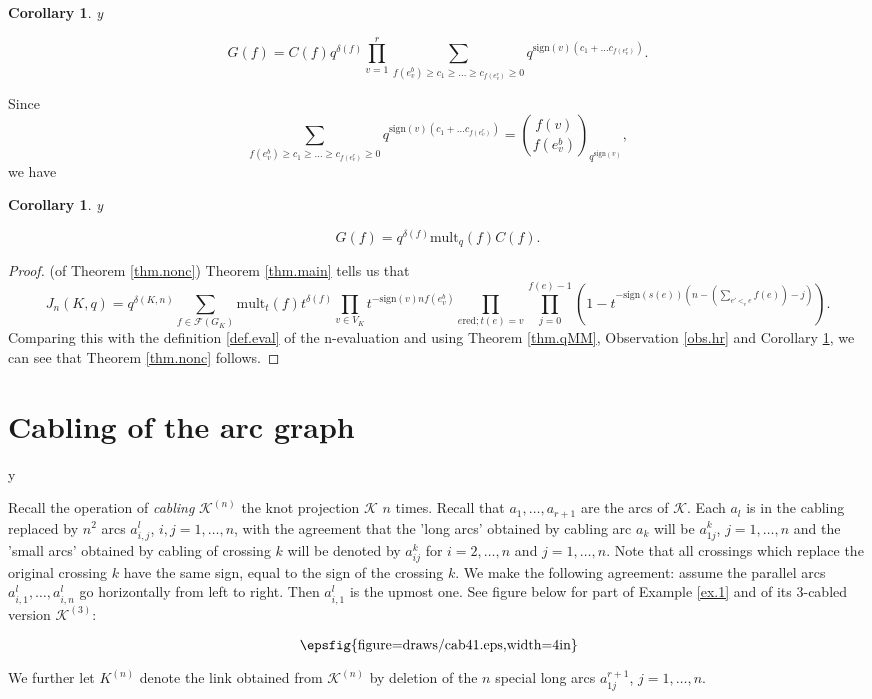 \documentclass{amsart}
\theoremstyle{plain}
\newtheorem{corollary}[proposition]{Corollary}
\theoremstyle{definition}
\theoremstyle{remark}
\def\printname#1{
        \if\draft y
                \smash{\makebox[0pt]{\hspace{-0.5in}
                        \raisebox{8pt}{\tt\tiny #1}}}
        \fi
}
\newcommand{\psdraw}[2]
         {\begin{array}{c} \hspace{-1.3mm}
        \raisebox{-4pt}{\epsfig{figure=draws/#1.eps,width=#2}}
        \hspace{-1.9mm}\end{array}}
\def\lbl#1{\label{#1}\printname{#1}}
\def\K{\mathcal K}
\def\F{\mathcal F}
\def\d{\delta}
\def\sign{\mathrm{sign}}
\def\mult{\mathrm{mult}}
\begin{document}
\begin{corollary}
\lbl{cor.h}
$$
G(f)= C(f)q^{\d(f)}\prod_{v=1}^r
\sum_{f(e^b_v)\geq c_1\geq\dots \geq c_{f(e^r_v)}\geq 0}
q^{\sign(v)(c_1+\dots c_{f(e^r_v)})}.
$$
\end{corollary}

Since
$$
\sum_{f(e^b_v)\geq c_1\geq\dots \geq c_{f(e^r_v)}\geq 0}
q^{\sign(v)(c_1+\dots c_{f(e^r_v)})}=
\binom{f(v)}{f(e^b_v)}_{q^{\sign(v)}},
$$
we have 

\begin{corollary}
\lbl{cor.skoro}
$$
G(f)= q^{\d(f)}\mult_q(f)C(f).
$$
\end{corollary}

\begin{proof}(of Theorem \ref{thm.nonc})
Theorem \ref{thm.main} tells us that 
$$
J_n(K,q) = q^{\d(K,n)}\sum_{f\in \F(G_K)}\mult_{t}(f)
t^{\d(f)} \prod_{v \in V_K} t^{-\sign(v)nf(e^b_v)}
\prod_{e\text{red};t(e)=v}\prod_{j=0}^{f(e)-1} 
(1-t^{-\sign(s(e))(n- (\sum_{e'<_v e}f(e))-j)}).  
$$
Comparing this with the definition \ref{def.eval} of the n-evaluation and 
using 
Theorem \ref{thm.qMM}, Observation \ref{obs.hr} and Corollary \ref{cor.skoro},
we can see that Theorem \ref{thm.nonc} follows.
\end{proof}

\section{Cabling of the arc graph}
\lbl{sec.stateCJ}

Recall the operation of {\em cabling} $\K^{(n)}$ the knot projection $\K$ $n$ 
times.
 Recall that $a_1,\dots, a_{r+1}$ are the arcs of $\K$.
Each $a_l$ is in the cabling replaced by $n^2$ arcs $a^l_{i,j}$, 
$i,j=1,\dots, n$,
with the agreement that the 'long arcs' obtained by cabling arc $a_k$ will be
$a^k_{1j}$, $j=1,\dots, n$ and the 'small arcs' obtained by cabling of crossing
$k$ will be denoted by $a^k_{ij}$ for $i=2,\dots, n$ and $j=1,\dots, n$.
Note that all crossings which replace the original crossing $k$ have the
same sign, equal to the sign of the crossing $k$.
We make the following agreement: assume the parallel arcs 
$a^l_{i,1},\dots, a^l_{i,n}$
go horizontally from left to right. Then $a^l_{i,1}$ is the upmost one.
See figure below for part of Example \ref{ex.1} and of its
3-cabled version $\K^{(3)}$:
$$
\psdraw{cab41}{4in}
$$

We further let $K^{(n)}$ denote the link obtained from $\K^{(n)}$ by deletion
of the $n$ special long arcs $a^{r+1}_{1j}$, $j=1,\dots, n$.
\end{document}
